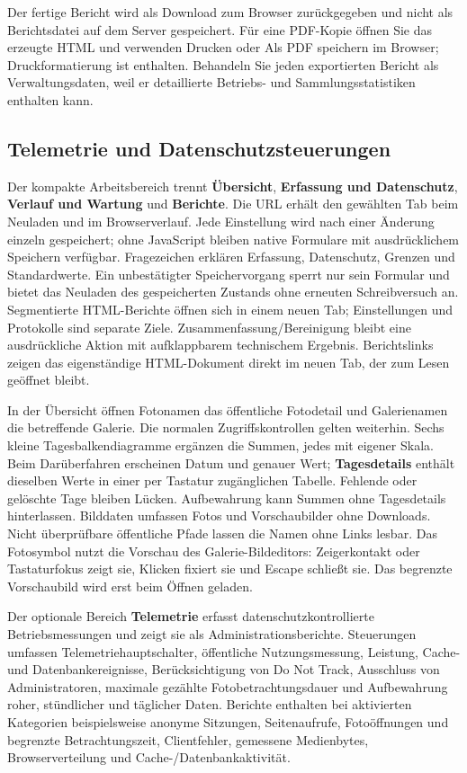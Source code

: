 \documentclass[11pt,a4paper]{article}
\newcommand{\ui}[1]{\textbf{#1}}
\begin{document}
Der fertige Bericht wird als Download zum Browser zurückgegeben und nicht als
Berichtsdatei auf dem Server gespeichert. Für eine PDF-Kopie öffnen Sie das
erzeugte HTML und verwenden Drucken oder Als PDF speichern im Browser;
Druckformatierung ist enthalten. Behandeln Sie jeden exportierten Bericht als
Verwaltungsdaten, weil er detaillierte Betriebs- und Sammlungsstatistiken
enthalten kann.

\subsection{Telemetrie und Datenschutzsteuerungen}

Der kompakte Arbeitsbereich trennt \ui{Übersicht},
\ui{Erfassung und Datenschutz}, \ui{Verlauf und Wartung} und \ui{Berichte}.
Die URL erhält den gewählten Tab beim Neuladen und im Browserverlauf.
Jede Einstellung wird nach einer Änderung einzeln gespeichert; ohne
JavaScript bleiben native Formulare mit ausdrücklichem Speichern verfügbar.
Fragezeichen erklären Erfassung, Datenschutz, Grenzen und Standardwerte.
Ein unbestätigter Speichervorgang sperrt nur sein Formular und bietet das
Neuladen des gespeicherten Zustands ohne erneuten Schreibversuch an.
Segmentierte HTML-Berichte öffnen sich in einem neuen Tab; Einstellungen und
Protokolle sind separate Ziele. Zusammenfassung/Bereinigung bleibt eine
ausdrückliche Aktion mit aufklappbarem technischem Ergebnis.
Berichtslinks zeigen das eigenständige HTML-Dokument direkt im neuen Tab,
der zum Lesen geöffnet bleibt.

In der Übersicht öffnen Fotonamen das öffentliche Fotodetail und Galerienamen
die betreffende Galerie. Die normalen Zugriffskontrollen gelten weiterhin.
Sechs kleine Tagesbalkendiagramme ergänzen die Summen, jedes mit eigener Skala.
Beim Darüberfahren erscheinen Datum und genauer Wert; \ui{Tagesdetails}
enthält dieselben Werte in einer per Tastatur zugänglichen Tabelle. Fehlende
oder gelöschte Tage bleiben Lücken. Aufbewahrung kann Summen ohne Tagesdetails
hinterlassen. Bilddaten umfassen Fotos und Vorschaubilder ohne Downloads.
Nicht überprüfbare öffentliche Pfade lassen die Namen ohne Links lesbar.
Das Fotosymbol nutzt die Vorschau des Galerie-Bildeditors: Zeigerkontakt oder
Tastaturfokus zeigt sie, Klicken fixiert sie und Escape schließt sie.
Das begrenzte Vorschaubild wird erst beim Öffnen geladen.

Der optionale Bereich \ui{Telemetrie} erfasst datenschutzkontrollierte
Betriebsmessungen und zeigt sie als Administrationsberichte. Steuerungen
umfassen Telemetriehauptschalter, öffentliche Nutzungsmessung, Leistung, Cache-
und Datenbankereignisse, Berücksichtigung von Do Not Track, Ausschluss von
Administratoren, maximale gezählte Fotobetrachtungsdauer und Aufbewahrung roher,
stündlicher und täglicher Daten. Berichte enthalten bei aktivierten Kategorien
beispielsweise anonyme Sitzungen, Seitenaufrufe, Fotoöffnungen und begrenzte
Betrachtungszeit, Clientfehler, gemessene Medienbytes, Browserverteilung und
Cache-/Datenbankaktivität.
\end{document}
